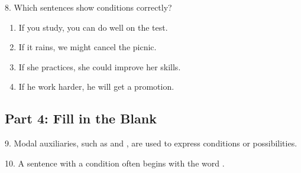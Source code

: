 \documentclass[12pt]{article}
\begin{document}
8. Which sentences show conditions correctly?\\
\begin{enumerate}[label=\Alph*.]
    \item If you study, you can do well on the test.  
    \item If it rains, we might cancel the picnic.  
    \item If she practices, she could improve her skills.  
    \item If he work harder, he will get a promotion.  
\end{enumerate}

\vspace{1cm}

\subsection*{Part 4: Fill in the Blank}
\vspace{1cm}
9. Modal auxiliaries, such as \underline{\hspace{4cm}} and \underline{\hspace{4cm}}, are used to express conditions or possibilities.

\vspace{3cm}

10. A sentence with a condition often begins with the word \underline{\hspace{4cm}}.

\vspace{3cm}
\newpage

\end{document}
